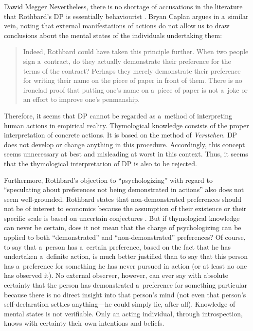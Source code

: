 \begin{artengenv}{Dawid Megger}
Nevertheless, there is no shortage of accusations in the literature that Rothbard's DP is essentially behaviourist 
\parencite[e.g.,][p.574]{prychitko_formalism_1993}. %
 Bryan Caplan argues in a~similar vein, noting that external manifestations of actions do not allow us to draw conclusions about the mental states of the individuals undertaking them:
\begin{quote}
Indeed, Rothbard could have taken this principle further. When two people sign a~contract, do they actually demonstrate their preference for the terms of the contract? Perhaps they merely demonstrate their preference for writing their name on the piece of paper in front of them. There is no ironclad proof that putting one's name on a~piece of paper is not a~joke or an effort to improve one's penmanship. 
\parencite[][p.833]{caplan_austrian_1999}%
\end{quote}
Therefore, it seems that DP cannot be regarded as a~method of interpreting human actions in empirical reality. Thymological knowledge consists of the proper interpretation of concrete actions. It is based on the method of \textit{Verstehen}. DP does not develop or change anything in this procedure. Accordingly, this concept seems unnecessary at best and misleading at worst in this context. Thus, it seems that the thymological interpretation of DP is also to be rejected.



Furthermore, Rothbard's objection to ``psychologizing'' with regard to ``speculating about preferences not being demonstrated in actions'' also does not seem well-grounded. Rothbard states that non-demonstrated preferences should not be of interest to economics because the assumption of their existence or their specific scale is based on uncertain conjectures 
\parencite[][pp.296–298]{rothbard_present_2011}. %
 But if thymological knowledge can never be certain, does it not mean that the charge of psychologizing can be applied to both ``demonstrated'' and ``non-demonstrated'' preferences? Of course, to say that a~person has a~certain preference, based on the fact that he has undertaken a~definite action, is much better justified than to say that this person has a~preference for something he has never pursued in action (or at least no one has observed it). No external observer, however, can ever say with absolute certainty that the person has demonstrated a~preference for something particular because there is no direct insight into that person's mind (not even that person's self-declaration settles anything---he could simply lie, after all). Knowledge of mental states is not verifiable. Only an acting individual, through introspection, knows with certainty their own intentions and beliefs.




\end{artengenv}
